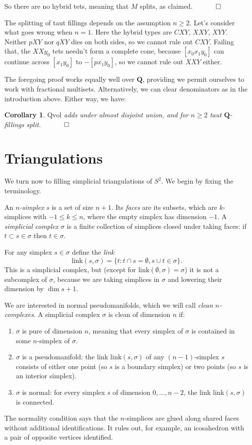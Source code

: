 \documentclass[12pt]{article}
\newtheorem{corollary}{Corollary}
\newcommand{\proofend}{$\quad \qed$}
\def\QQ{\mathbf{Q}}
\newcommand{\kw}{\mathrm}
\newcommand{\link}{\kw{link}}
\newcommand{\Qvol}{\kw{Qvol}}
\begin{document}
So there are no hybrid tets, meaning that $M$ splits, as claimed.
\proofend

The splitting of taut fillings depends on the assumption $n\geq 2$.
Let's consider what goes wrong when $n=1$.
Here the hybrid types are $CXY$, $XXY$, $XYY$.
Neither $pXY$ nor $qXY$ dies on both sides, so we cannot rule out $CXY$.
Failing that, the $XXy_0$ tets needn't form a complete cone,
because $[x_0x_1y_0]$ can continue across $[x_1 y_0]$ to $-[p x_1 y_0]$,
so we cannot rule out $XXY$ either.

The foregoing proof works equally well over $\QQ$, providing we
permit ourselves to work with fractional multisets.
Alternatively, we can clear denominators as in the introduction
above.
Either way, we have:

\begin{corollary} \label{cor1}
$\Qvol$ adds under almost disjoint union,
and for $n \geq 2$
taut $\QQ$-fillings split.
\proofend
\end{corollary}

\section{Triangulations}

We turn now to filling simplicial triangulations of $S^2$.
We begin by fixing the terminology.

An \emph{$n$-simplex} $s$ is a set of size $n+1$.
Its \emph{faces} are its subsets,
which are $k$-simplices with $-1 \leq k \leq n$,
where the empty simplex has dimension $-1$.
A \emph{simplicial complex} $\sigma$ is a finite collection of simplices
closed under taking faces:
if $t \subset s \in \sigma$ then $t \in \sigma$.

For any simplex $s \in \sigma$ define the \emph{link}
\[
\link(s,\sigma) = \{t: t \cap s = \emptyset, s \cup t \in \sigma \}
.
\]
This is a simplicial complex, but
(except for $\link(\emptyset,\sigma)=\sigma$)
it is not a subcomplex of $\sigma$,
because we are taking simplices in $\sigma$ and lowering
their dimension by $\dim s+1$.

We are interested in normal pseudomanifolds,
which we will call \emph{clean $n$-complexes}.
A simplicial complex $\sigma$ is clean of dimension $n$ if:
\begin{enumerate}
\item
$\sigma$ is pure of dimension $n$,
meaning that every simplex of $\sigma$ is contained in some
$n$-simplex of $\sigma$.

\item
$\sigma$ is a pseudomanifold:
the link $\link(s,\sigma)$ of any $(n-1)$-simplex $s$
consists of either one point
(so $s$ is a boundary simplex)
or two points
(so $s$ is an interior simplex).

\item
$\sigma$ is normal:
for every simplex $s$ of dimension $0,\ldots,n-2$,
the link $\link(s,\sigma)$ is connected.
\end{enumerate}
The normality condition says that the $n$-simplices are glued along
shared faces without additional identifications.  It rules out,
for example, an icosahedron with a pair of opposite vertices identified.
\end{document}
